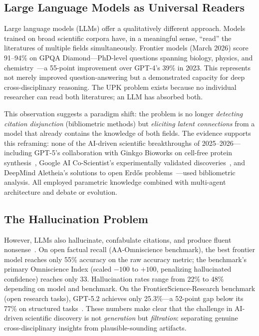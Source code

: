 \subsection{Large Language Models as Universal Readers}

Large language models (LLMs) offer a qualitatively different approach. Models trained on broad scientific corpora have, in a meaningful sense, ``read'' the literatures of multiple fields simultaneously. Frontier models (March 2026) score 91--94\% on GPQA Diamond---PhD-level questions spanning biology, physics, and chemistry~\citep{rein2023}---a 55-point improvement over GPT-4's 39\% in 2023. This represents not merely improved question-answering but a demonstrated capacity for deep cross-disciplinary reasoning. The UPK problem exists because no individual researcher can read both literatures; an LLM has absorbed both.

This observation suggests a paradigm shift: the problem is no longer \emph{detecting citation disjunction} (bibliometric methods) but \emph{eliciting latent connections} from a model that already contains the knowledge of both fields. The evidence supports this reframing: none of the AI-driven scientific breakthroughs of 2025--2026---including GPT-5's collaboration with Ginkgo Bioworks on cell-free protein synthesis~\citep{ginkgo2026}, Google AI Co-Scientist's experimentally validated discoveries~\citep{gottweis2025}, and DeepMind Aletheia's solutions to open Erd\H{o}s problems~\citep{deepmind2025aletheia}---used bibliometric analysis. All employed parametric knowledge combined with multi-agent architecture and debate or evolution.

\subsection{The Hallucination Problem}

However, LLMs also hallucinate, confabulate citations, and produce fluent nonsense~\citep{ji2023}. On open factual recall (AA-Omniscience benchmark), the best frontier model reaches only 55\% accuracy on the raw accuracy metric; the benchmark's primary Omniscience Index (scaled $-100$ to $+100$, penalizing hallucinated confidence) reaches only 33. Hallucination rates range from 22\% to 48\% depending on model and benchmark. On the FrontierScience-Research benchmark (open research tasks), GPT-5.2 achieves only 25.3\%---a 52-point gap below its 77\% on structured tasks~\citep{openai2025frontier}. These numbers make clear that the challenge in AI-driven scientific discovery is not \emph{generation} but \emph{filtration}: separating genuine cross-disciplinary insights from plausible-sounding artifacts.


